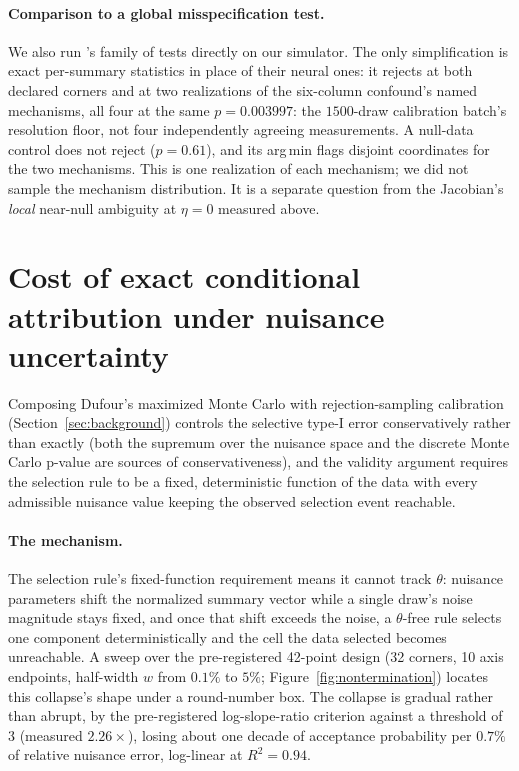 \documentclass{article}
\begin{document}
\paragraph{Comparison to a global misspecification test.} We also run
\citet{montel2025testsmodelmisspecificationsimulationbased}'s family of tests directly on our
simulator. The only simplification is exact per-summary statistics in place of their neural
ones: it rejects at both declared corners and at
two realizations of the six-column confound's named mechanisms, all four at the same
$p=0.003997$: the $1500$-draw calibration batch's resolution floor, not four
independently agreeing measurements. A
null-data control does not reject ($p=0.61$), and its arg\,min flags disjoint coordinates for
the two mechanisms. This is one realization of each
mechanism; we did not sample the mechanism distribution. It is a separate question from the
Jacobian's \emph{local} near-null ambiguity at $\eta=0$ measured above.

\section{Cost of exact conditional attribution under nuisance uncertainty}
\label{sec:negative-result}

Composing Dufour's maximized Monte Carlo with rejection-sampling calibration
(Section~\ref{sec:background}) controls the selective type-I error conservatively
rather than exactly (both the supremum over the nuisance space and the discrete Monte Carlo
p-value are sources of conservativeness), and the validity argument requires the selection rule to
be a fixed, deterministic function of the data with every admissible nuisance value keeping
the observed selection event reachable.

\paragraph{The mechanism.}
The selection rule's fixed-function requirement means it cannot track $\theta$: nuisance
parameters shift the normalized summary vector while a single draw's noise magnitude stays
fixed, and once that shift exceeds the noise, a $\theta$-free rule selects one component
deterministically and the cell the data selected becomes unreachable. A sweep over the
pre-registered 42-point design (32 corners, 10 axis endpoints, half-width $w$ from $0.1\%$ to
$5\%$; Figure~\ref{fig:nontermination}) locates this collapse's shape under a round-number box.
The collapse is gradual rather than abrupt, by the
pre-registered log-slope-ratio criterion against a threshold of 3 (measured $2.26\times$), losing
about one decade of acceptance probability per $0.7\%$ of relative nuisance error, log-linear at
$R^2=0.94$.
\end{document}
